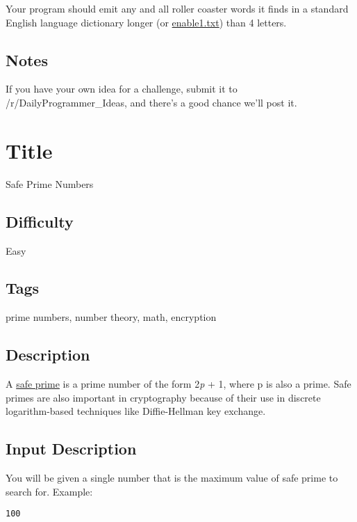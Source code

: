 Your program should emit any and all roller coaster words it finds in a
standard English language dictionary longer (or
\href{https://github.com/dolph/dictionary/blob/master/enable1.txt}{enable1.txt})
than 4 letters.

\subsection{Notes}\label{notes-1}

If you have your own idea for a challenge, submit it to
/r/DailyProgrammer\_Ideas, and there's a good chance we'll post it.

\section{Title}\label{title-39}

Safe Prime Numbers

\subsection{Difficulty}\label{difficulty-38}

Easy

\subsection{Tags}\label{tags-39}

prime numbers, number theory, math, encryption

\subsection{Description}\label{description-39}

A \href{https://en.wikipedia.org/wiki/Safe_prime}{safe prime} is a prime
number of the form 2\emph{p} + 1, where p is also a prime. Safe primes
are also important in cryptography because of their use in discrete
logarithm-based techniques like Diffie-Hellman key exchange.

\subsection{Input Description}\label{input-description-26}

You will be given a single number that is the maximum value of safe
prime to search for. Example:

\begin{verbatim}
100
\end{verbatim}

